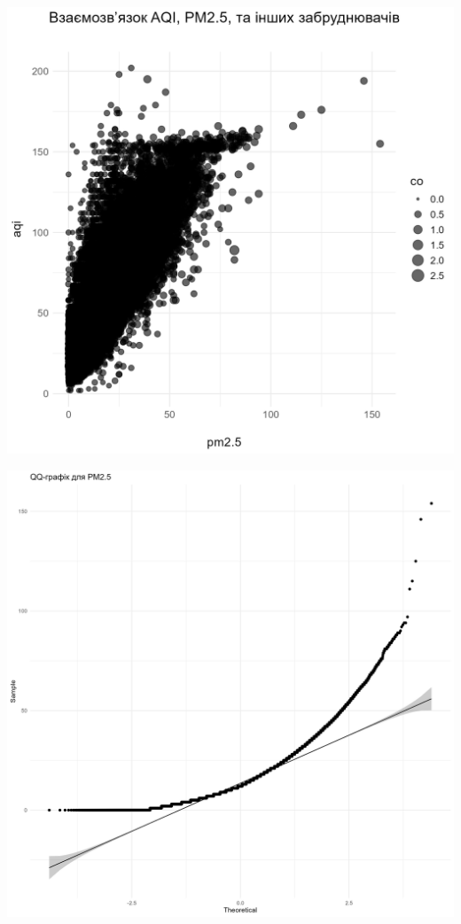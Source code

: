 \documentclass[./report.tex]{subfiles}
\begin{document}
\begin{enumerate}
  \includegraphics[width=6in]{plots/question1/aqi_pm_polutants.png}

  \includegraphics[width=6in]{plots/question1/qq_pm2_5.png}


\end{enumerate}
\end{document}

